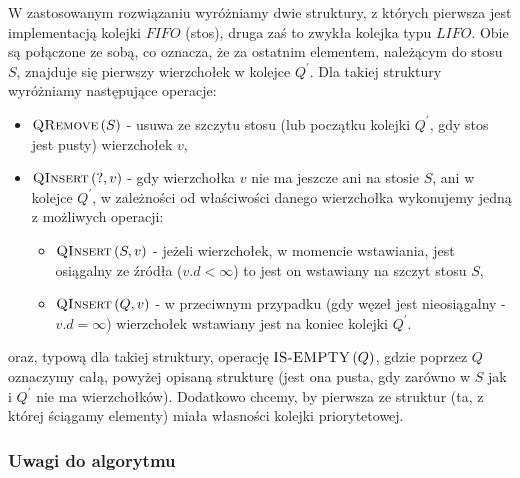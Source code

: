 W zastosowanym rozwiązaniu wyróżniamy dwie struktury, z których pierwsza jest implementacją kolejki $FIFO$ (stos), druga zaś to zwykła kolejka typu $LIFO$. Obie są połączone ze sobą, co oznacza, że za ostatnim elementem, należącym do stosu $S$, znajduje się pierwszy wierzchołek w kolejce $Q^{'}$. Dla takiej struktury wyróżniamy następujące operacje:

\begin{itemize}
\item $\textrm{\textsc{QRemove}} \left( S \right) $ - usuwa ze szczytu stosu (lub początku kolejki $Q^{'}$, gdy stos jest pusty) wierzchołek $v$,
\item $\textrm{\textsc{QInsert}} \left( ?, v \right)$ - gdy wierzchołka $v$ nie ma jeszcze ani na stosie $S$, ani w kolejce $Q^{'}$, w zależności od właściwości danego wierzchołka wykonujemy jedną z możliwych operacji:
\begin{itemize}
\item $\textrm{\textsc{QInsert}} \left( S, v \right) $ - jeżeli wierzchołek, w momencie wstawiania, jest osiągalny ze źródła ($v.d < \infty$) to jest on wstawiany na szczyt stosu $S$,
\item $\textrm{\textsc{QInsert}} \left( Q, v \right) $ - w przeciwnym przypadku (gdy węzeł jest nieosiągalny - $v.d = \infty$) wierzchołek wstawiany jest na koniec kolejki $Q^{'}$.
\end{itemize}
\end{itemize}

oraz, typową dla takiej struktury, operację $\textrm{\textsc{IS-EMPTY}} \left( Q \right) $, gdzie poprzez $Q$ oznaczymy całą, powyżej opisaną strukturę (jest ona pusta, gdy zarówno w $S$ jak i $Q^{'}$ nie ma wierzchołków). Dodatkowo chcemy, by pierwsza ze struktur (ta, z której ściągamy elementy) miała własności kolejki priorytetowej.

\subsubsection{Uwagi do algorytmu}

